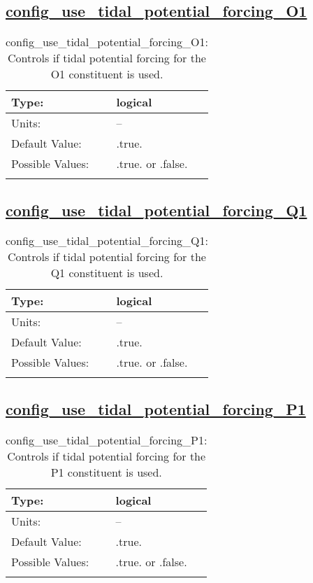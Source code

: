 \subsection[config\_use\_tidal\_potential\_forcing\_O1]{\hyperref[sec:nm_tab_tidal_potential_forcing]{config\_use\_tidal\_potential\_forcing\_O1}}
\label{subsec:nm_sec_config_use_tidal_potential_forcing_O1}
\begin{center}
\begin{longtable}{| p{2.0in} || p{4.0in} |}
    \hline
    Type: & logical \\
    \hline
    Units: & -- \\
    \hline
    Default Value: & .true. \\
    \hline
    Possible Values: & .true. or .false. \\
    \hline
    \caption{config\_use\_tidal\_potential\_forcing\_O1: Controls if tidal potential forcing for the O1 constituent is used.}
\end{longtable}
\end{center}
\subsection[config\_use\_tidal\_potential\_forcing\_Q1]{\hyperref[sec:nm_tab_tidal_potential_forcing]{config\_use\_tidal\_potential\_forcing\_Q1}}
\label{subsec:nm_sec_config_use_tidal_potential_forcing_Q1}
\begin{center}
\begin{longtable}{| p{2.0in} || p{4.0in} |}
    \hline
    Type: & logical \\
    \hline
    Units: & -- \\
    \hline
    Default Value: & .true. \\
    \hline
    Possible Values: & .true. or .false. \\
    \hline
    \caption{config\_use\_tidal\_potential\_forcing\_Q1: Controls if tidal potential forcing for the Q1 constituent is used.}
\end{longtable}
\end{center}
\subsection[config\_use\_tidal\_potential\_forcing\_P1]{\hyperref[sec:nm_tab_tidal_potential_forcing]{config\_use\_tidal\_potential\_forcing\_P1}}
\label{subsec:nm_sec_config_use_tidal_potential_forcing_P1}
\begin{center}
\begin{longtable}{| p{2.0in} || p{4.0in} |}
    \hline
    Type: & logical \\
    \hline
    Units: & -- \\
    \hline
    Default Value: & .true. \\
    \hline
    Possible Values: & .true. or .false. \\
    \hline
    \caption{config\_use\_tidal\_potential\_forcing\_P1: Controls if tidal potential forcing for the P1 constituent is used.}
\end{longtable}
\end{center}
